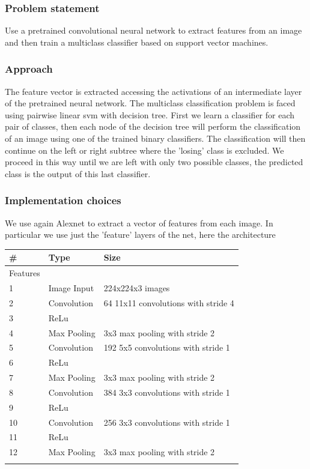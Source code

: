 \documentclass[12pt, a4paper]{report}
\begin{document}
\subsubsection*{Problem statement}
Use a pretrained convolutional neural network to extract features from an image and then train a multiclass classifier based on support vector machines.

\subsubsection*{Approach}
The feature vector is extracted accessing the activations of an intermediate layer of the pretrained neural network.
The multiclass classification problem is faced using pairwise linear svm with decision tree. 
First we learn a classifier for each pair of classes, then each node of the decision tree will perform the classification of an image using one of the trained binary classifiers. 
The classification will then continue on the left or right subtree where the 'losing' class is excluded. We proceed in this way until we are left with only two possible classes, the predicted class is the output of this last classifier.

\subsubsection*{Implementation choices}
We use again Alexnet to extract a vector of features from each image. In particular we use just the 'feature' layers of the net, here the architecture

\begin{table}[h!]
	\centering
	\begin{tabular}{lll}
		\# & Type & Size \\
		\midrule
		Features & & \\
		1 & Image Input & 224x224x3 images \\
		2 & Convolution & 64 11x11 convolutions with stride 4 \\
		3 & ReLu & \\
		4 & Max Pooling & 3x3 max pooling with stride 2 \\
		5 & Convolution & 192 5x5 convolutions with stride 1 \\
		6 & ReLu & \\
		7 & Max Pooling & 3x3 max pooling with stride 2 \\
		8 & Convolution & 384 3x3 convolutions with stride 1 \\
		9 & ReLu & \\
		10 & Convolution & 256 3x3 convolutions with stride 1 \\
		11 & ReLu & \\
		12 & Max Pooling & 3x3 max pooling with stride 2 \\
		\bottomrule
		\label{tab:baseline}
	\end{tabular}
\end{table}
\end{document}
